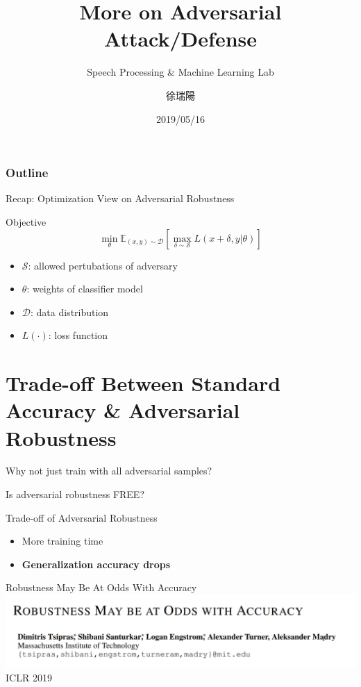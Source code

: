 \documentclass{beamer}
\title{More on Adversarial Attack/Defense}
\subtitle{\textcolor[rgb]{0.00,0.50,1.00}{{Speech Processing \& Machine Learning Lab}}}
\author{徐瑞陽}
\date{2019/05/16}
\begin{document}
\begin{frame}
\maketitle
\end{frame}

\begin{frame}
\frametitle{Outline}
\tableofcontents
\end{frame}

\begin{frame}{Recap: Optimization View on Adversarial Robustness}
  \begin{block}{Objective}
    \[ \min_\theta \mathbb{E}_{(x,y) \sim \mathcal{D}}[\max_{\delta \sim \mathcal{S}}L(x+\delta,y|\theta)]\]
  \end{block}
  \begin{itemize}
    \item $\mathcal{S}$: allowed pertubations of adversary
    \item $\theta$: weights of classifier model
    \item $\mathcal{D}$: data distribution
    \item $L(\cdot)$: loss function
  \end{itemize}
\end{frame}

\section{Trade-off Between Standard Accuracy \& Adversarial Robustness}

\begin{frame}
    \center \LARGE{Why not just train with all adversarial samples?}
\end{frame}

\begin{frame}
    \center \LARGE{Is adversarial robustness FREE?}
\end{frame}

\begin{frame}{Trade-off of Adversarial Robustness}
  \begin{itemize}
    \item More training time
    \item \textbf{Generalization accuracy drops} 
  \end{itemize}
\end{frame}

\begin{frame}{Robustness May Be At Odds With Accuracy}
  \includegraphics[width=\textwidth]{fig/p2/title.png}
  \center ICLR 2019
\end{frame}
\end{document}
